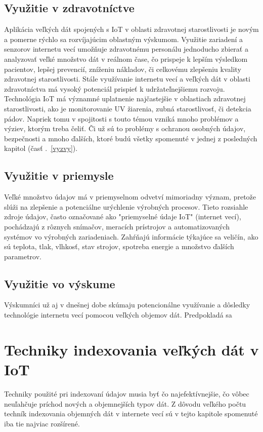 \documentclass[10pt,twoside,slovak,a4paper]{article}
\begin{document}
\subsection{Využitie v zdravotníctve}
Aplikácia veľkých dát spojených s IoT v oblasti zdravotnej starostlivosti je novým a pomerne rýchlo sa rozvíjajúcim oblastným výskumom. Využitie zariadení a senzorov internetu vecí umožňuje zdravotnému personálu jednoducho zbierať a analyzovať veľké množstvo dát v reálnom čase, čo prispeje k lepším výsledkom pacientov, lepšej prevencií, zníženiu nákladov, či celkovému zlepšeniu kvality zdravotnej starostlivosti.\cite{2021}
Stále využívanie internetu vecí a veľkých dát v oblasti zdravotníctva má vysoký potenciál prispieť k udržateľnejšiemu rozvoju. Technológia IoT má významné uplatnenie najčastejšie v oblastiach zdravotnej starostlivosti, ako je monitorovanie UV žiarenia, zubná starostlivosť, či detekcia pádov.\cite{Singh2020EmergenceOI}
Napriek tomu v spojitosti s touto témou vzniká mnoho problémov a výziev, ktorým treba čeliť. Či už sú to problémy s ochranou osobných údajov, bezpečnosti a mnoho ďalších, ktoré budú všetky spomenuté v jednej z posledných kapitol (časť .~\ref{vyzvy}).



\subsection{Využitie v priemysle}
Veľké množstvo údajov má v priemyselnom odvetví mimoriadny význam, pretože slúži na zlepšenie a potenciálne urýchlenie výrobných procesov. Tieto rozsiahle zdroje údajov, často označované ako "priemyselné údaje IoT" (internet vecí), pochádzajú z rôznych snímačov, meracích prístrojov a automatizovaných systémov vo výrobných zariadeniach. Zahŕňajú informácie týkajúce sa veličín, ako sú teplota, tlak, vlhkosť, stav strojov, spotreba energie a množstvo ďalších parametrov. \cite{Zhou2021VariationalLE}


\subsection{Využitie vo výskume}
Výskumníci už aj v dnešnej dobe skúmaju potencionálne využívanie a dôsledky technológie internetu vecí pomocou veľkých objemov dát. Predpokladá sa \cite{Riggins2015ResearchDO}


\section{Techniky indexovania veľkých dát v IoT} \label{techniky}
Techniky použité pri indexovaní údajov musia byť čo najefektívnejšie, čo vôbec neuľahčuje príchod nových a objemnejších typov dát. Z dôvodu veľkého počtu techník indexovania objemných dát v internete vecí sú v tejto kapitole spomenuté iba tie najviac rozšírené.
\end{document}
